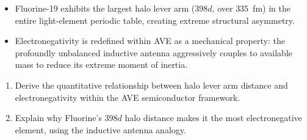 \begin{summarybox}
\begin{itemize}
    \item Fluorine-19 exhibits the largest halo lever arm ($398d$, over $335$~fm) in the entire light-element periodic table, creating extreme structural asymmetry.
    \item Electronegativity is redefined within AVE as a mechanical property: the profoundly unbalanced inductive antenna aggressively couples to available mass to reduce its extreme moment of inertia.
\end{itemize}
\end{summarybox}

\begin{exercisebox}
\begin{enumerate}
    \item Derive the quantitative relationship between halo lever arm distance and electronegativity within the AVE semiconductor framework.
    \item Explain why Fluorine's $398d$ halo distance makes it the most electronegative element, using the inductive antenna analogy.
\end{enumerate}
\end{exercisebox}


